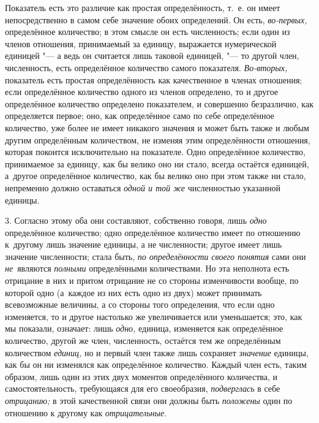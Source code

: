 Показатель есть это различие как простая определённость, т.~е. он имеет
непосредственно в самом себе значение обоих определений. Он есть, {\em
во-первых,} определённое количество; в этом смысле он есть численность; если
один из членов отношения, принимаемый за единицу, выражается нумерической
единицей "--- а ведь он считается лишь таковой единицей, "--- то другой член,
численность, есть определённое количество самого показателя. {\em Во-вторых,}
показатель есть простая определённость как качественное в членах отношения;
если определённое количество одного из членов определено, то и другое
определённое количество определено показателем, и совершенно безразлично, как
определяется первое; оно, как определённое само по себе определённое
количество, уже более не имеет никакого значения и может быть также и любым
другим определённым количеством, не изменяя этим определённости отношения,
которая покоится исключительно на показателе. Одно определённое количество,
принимаемое за единицу, как бы велико оно ни стало, всегда остаётся единицей,
а~другое определённое количество, как бы велико оно при этом также ни стало,
непременно должно оставаться {\em одной и той же} численностью указанной
единицы.

3. Согласно этому оба они составляют, собственно говоря, лишь {\em одно}
определённое количество; одно определённое количество имеет по отношению
к~другому лишь значение единицы, а не численности; другое имеет лишь значение
численности; стала быть, {\em по определённости своего понятия} сами они
{\em не}~являются {\em полными} определёнными количествами. Но эта неполнота
есть отрицание в них и притом отрицание не со стороны изменчивости вообще, по
которой одно (а~каждое из них есть одно из двух) может принимать всевозможные
величины, а со стороны того определения, что если одно изменяется, то и другое
настолько же увеличивается или уменьшается; это, как мы показали, означает:
лишь {\em одно,} единица, изменяется как определённое количество, другой же
член, численность, остаётся тем же определённым количеством {\em единиц,} но и
первый член также лишь сохраняет {\em значение} единицы, как бы он ни изменялся
как определённое количество. Каждый член есть, таким образом, лишь один из этих
двух моментов определённого количества, и самостоятельность, требующаяся для
его своеобразия, {\em подверглась} в себе {\em отрицанию;} в этой качественной
связи они должны быть {\em положены} один по отношению к другому как
{\em отрицательные}.


